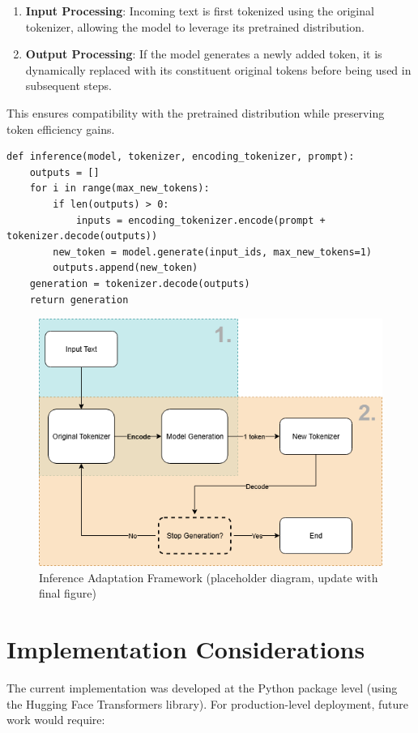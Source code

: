 \begin{enumerate}
    \item \textbf{Input Processing}: Incoming text is first tokenized using the original tokenizer, allowing the model to leverage its pretrained distribution.
    \item \textbf{Output Processing}: If the model generates a newly added token, it is dynamically replaced with its constituent original tokens before being used in subsequent steps.
\end{enumerate}

This ensures compatibility with the pretrained distribution while preserving token efficiency gains.

\begin{lstlisting}
def inference(model, tokenizer, encoding_tokenizer, prompt):
    outputs = []
    for i in range(max_new_tokens):
        if len(outputs) > 0:
            inputs = encoding_tokenizer.encode(prompt + tokenizer.decode(outputs))
        new_token = model.generate(input_ids, max_new_tokens=1)
        outputs.append(new_token)
    generation = tokenizer.decode(outputs)
    return generation
\end{lstlisting}

\begin{figure}[h]
    \centering
    \includegraphics[width=0.8\linewidth]{Figures/Inference Adaptation.png}
    \caption{Inference Adaptation Framework (placeholder diagram, update with final figure)}
    \label{fig:inference-adaptation}
\end{figure}

\section{Implementation Considerations}
The current implementation was developed at the Python package level (using the Hugging Face Transformers library). For production-level deployment, future work would require:

